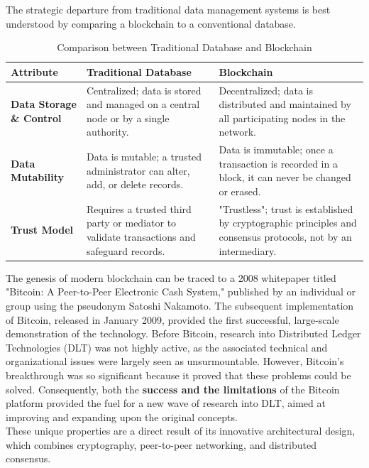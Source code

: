 \documentclass{scrbook}
\begin{document}
The strategic departure from traditional data management systems is best understood by comparing a blockchain to a conventional database.

\begin{table}[h]
    \centering
    \begin{tabular}{|p{}|p{}|p{}|}
    \hline
    \textbf{Attribute} & \textbf{Traditional Database} & \textbf{Blockchain} \\
    \hline
    \textbf{Data Storage \& Control} & Centralized; data is stored and managed on a central node or by a single authority. & Decentralized; data is distributed and maintained by all participating nodes in the network. \\
    \hline
    \textbf{Data Mutability} & Data is mutable; a trusted administrator can alter, add, or delete records. & Data is immutable; once a transaction is recorded in a block, it can never be changed or erased. \\
    \hline
    \textbf{Trust Model} & Requires a trusted third party or mediator to validate transactions and safeguard records. & "Trustless"; trust is established by cryptographic principles and consensus protocols, not by an intermediary. \\
    \hline
    \end{tabular}
    \caption{Comparison between Traditional Database and Blockchain}
\end{table}

The genesis of modern blockchain can be traced to a 2008 whitepaper titled "Bitcoin: A Peer-to-Peer Electronic Cash System," published by an individual or group using the pseudonym Satoshi Nakamoto. The subsequent implementation of Bitcoin, released in January 2009, provided the first successful, large-scale demonstration of the technology. Before Bitcoin, research into Distributed Ledger Technologies (DLT) was not highly active, as the associated technical and organizational issues were largely seen as unsurmountable. However, Bitcoin's breakthrough was so significant because it proved that these problems could be solved. Consequently, both the \textbf{success and the limitations} of the Bitcoin platform provided the fuel for a new wave of research into DLT, aimed at improving and expanding upon the original concepts. \\

These unique properties are a direct result of its innovative architectural design, which combines cryptography, peer-to-peer networking, and distributed consensus.
\end{document}
